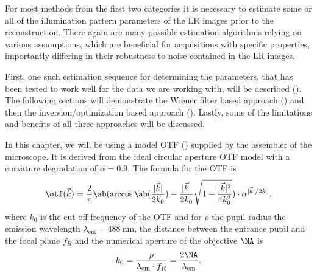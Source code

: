 For most methods from the first two categories it is necessary to estimate some or all of the illumination pattern 
    parameters of the \ac{LR} images prior to the reconstruction.
There again are many possible estimation algorithms relying on various assumptions, which are beneficial for
    acquisitions with specific properties, importantly differing in their robustness to noise contained in the \ac{LR} 
    images.

First, one such estimation sequence for determining the parameters, that has been tested to work well for the data we 
    are working with, will be described ().
The following sections will demonstrate the Wiener filter based approach 
    () and then the inversion/optimization based approach 
    ().
Lastly, some of the limitations and benefits of all three approaches will be discussed.

\begin{marginfigure}
    \caption{The \ac{OTF} model of the optical system.}
\end{marginfigure}

In this chapter, we will be using a model \ac{OTF} () supplied by the assembler of the 
    microscope.
It is derived from the ideal circular aperture \ac{OTF} model with a curvature degradation of \(\alpha = 0.9\).
The formula for the \ac{OTF} is
    \begin{equation*}
        \otf(\vec{k}) = \frac{2}{\pi}\ab(\arccos\ab(\frac{|\vec{k}|}{2k_0}) - \frac{|\vec{k}|}{2k_0}\sqrt{1
        - \frac{|\vec{k}|^2}{4k_0^2}}) \cdot \alpha^{|\vec{k}|/2k_0},
    \end{equation*}
    where \(k_0\) is the cut-off frequency of the \ac{OTF} and for \(\rho\) the pupil radius the emission wavelength 
    \(\lambda_{\text{em}} = \qty{488}{\nano\meter}\), the distance between the entrance pupil and the focal plane \(f_R\) and the 
    numerical aperture of the objective \(\NA\) is
\begin{equation*}
    k_0  = \frac{\rho}{\lambda_{\text{em}} \cdot f_R} = \frac{2\NA}{\lambda_{\text{em}}}.
\end{equation*}

